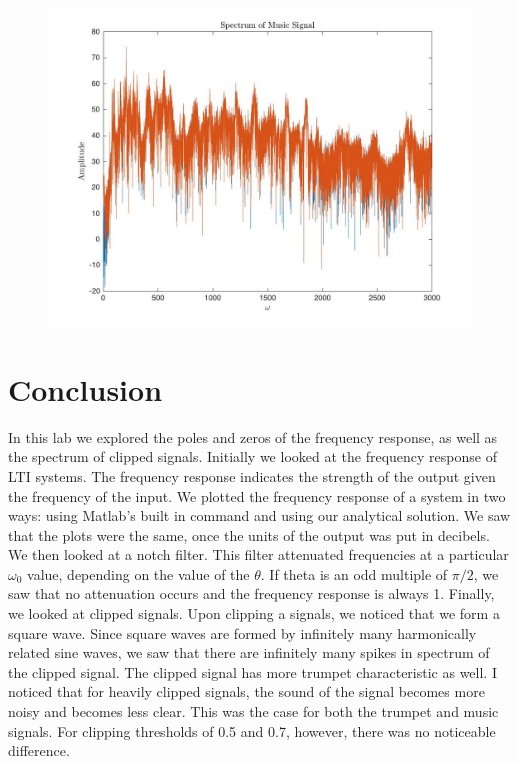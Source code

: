 \documentclass{article}
\begin{document}
\begin{figure}[!htbp]
\begin{minipage}{\linewidth}
\includegraphics[width = 1\linewidth, height = 0.5\textheight]{music.jpg}
\end{minipage}
\end{figure}

\FloatBarrier
\section{Conclusion}
In this lab we explored the poles and zeros of the frequency response, as well as the spectrum of clipped signals. Initially we looked at the frequency response of LTI systems. The frequency response indicates the strength of the output given the frequency of the input. We plotted the frequency response of a system in two ways: using Matlab's built in command and using our analytical solution. We saw that the plots were the same, once the units of the output was put in decibels. We then looked at a notch filter. This filter attenuated frequencies at a particular $\omega _0$ value, depending on the value of the $\theta$. If theta is an odd multiple of $\pi /2$, we saw that no attenuation occurs and the frequency response is always 1. Finally, we looked at clipped signals. Upon clipping a signals, we noticed that we form a square wave. Since square waves are formed by infinitely many harmonically related sine waves, we saw that there are infinitely many spikes in spectrum of the clipped signal. The clipped signal has more trumpet characteristic as well. I noticed that for heavily clipped signals, the sound of the signal becomes more noisy and becomes less clear. This was the case for both the trumpet and music signals. For clipping thresholds of 0.5 and 0.7, however, there was no noticeable difference.
\end{document}
